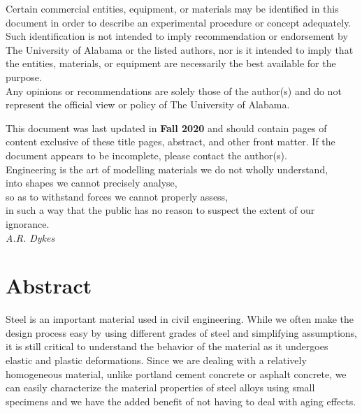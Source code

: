 \documentclass[12pt]{article}
\newcommand{\LastUpdate}{Fall 2020}
\begin{document}
\begin{titlepage}
\begin{center}
\normalsize 
Certain commercial entities, equipment, or materials may be identified in this document in order to describe an experimental procedure or concept adequately. Such identification is not intended to imply recommendation or endorsement by The University of Alabama or the listed authors, nor is it intended to imply that the entities, materials, or equipment are necessarily the best available for the purpose.\\
\vfill
Any opinions or recommendations are solely those of the author(s) and do not represent the official view or policy of The University of Alabama.
\end{center}
\begin{flushright}
\vfill
\normalsize 
This document was last updated in \textbf{\LastUpdate} and should contain \textbf{\pageref{LastPage}} pages of content exclusive of these title pages, abstract, and other front matter. If the document appears to be incomplete, please contact the author(s).\\
\vfill
Engineering is the art of modelling materials we do not wholly understand,\\into shapes we cannot precisely analyse,\\so as to withstand forces we cannot properly assess,\\in such a way that the public has no reason to suspect the extent of our ignorance.\\
\textit{A.R. Dykes}
\end{flushright}
\end{titlepage}
\section*{Abstract}
\normalsize Steel is an important material used in civil engineering. While we often make the design process easy by using different grades of steel and simplifying assumptions, it is still critical to understand the behavior of the material as it undergoes elastic and plastic deformations. Since we are dealing with a relatively homogeneous material, unlike portland cement concrete or asphalt concrete, we can easily characterize the material properties of steel alloys using small specimens and we have the added benefit of not having to deal with aging effects.
\end{document}

